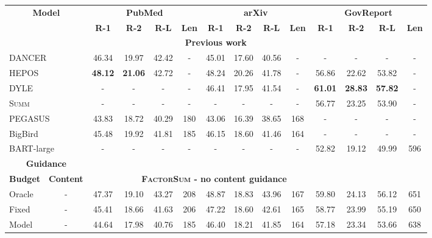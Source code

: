 \documentclass[11pt,table]{article}
\newcommand{\modelname}{FactorSum}
\begin{document}
\begin{table*}[h]
  \centering
  \setlength\tabcolsep{3.5pt}
  \begin{tabular}{lc|cccc|cccc|cccc}
    \toprule
    \multicolumn{2}{c|}{\multirow{2}{2.2cm}{\centering \textbf{Model}}} & \multicolumn{4}{c|}{\textbf{PubMed}} & \multicolumn{4}{c|}{\textbf{arXiv}} & \multicolumn{4}{c}{\textbf{GovReport}} \\
    \cmidrule(r){3-6} \cmidrule(r){7-10} \cmidrule(r){11-14} 
    &  & \textbf{R-1} & \textbf{R-2} & \textbf{R-L} & \textbf{Len} & \textbf{R-1} & \textbf{R-2} & \textbf{R-L} & \textbf{Len} & \textbf{R-1} & \textbf{R-2} & \textbf{R-L} & \textbf{Len} \\
    \toprule
    \multicolumn{14}{c}{\textbf{Previous work}} \\
    \midrule
    \multicolumn{2}{l|}{DANCER} & 46.34 & 19.97 & 42.42 & - & 45.01 & 17.60 & 40.56 & - & - & - & - & - \\
    \multicolumn{2}{l|}{HEPOS} & \textbf{48.12} & \textbf{21.06} & 42.72 & - & 48.24 & 20.26 & 41.78 & - & 56.86 & 22.62 & 53.82 & - \\
    \multicolumn{2}{l|}{DYLE} & - & - & - & - & 46.41 & 17.95 & 41.54 & - & \textbf{61.01} & \textbf{28.83} & \textbf{57.82} & - \\
    \multicolumn{2}{l|}{\textsc{Summ}} & - & - & - & - & - & - & - & - & 56.77 & 23.25 & 53.90 & - \\
    \multicolumn{2}{l|}{PEGASUS} & 43.83 & 18.72 & 40.29 & 180 & 43.06 & 16.39 & 38.65 & 168 & - & - & - & - \\
    \multicolumn{2}{l|}{BigBird} & 45.48 & 19.92 & 41.81 & 185 & 46.15 & 18.60 & 41.46 & 164 & - & - & - & - \\
    \multicolumn{2}{l|}{BART-large} & - & - & - & - & - & - & - & - & 52.82 & 19.12 & 49.99 & 596 \\
    \midrule
    \multicolumn{2}{c|}{\textbf{Guidance}} & \multicolumn{12}{c}{} \\
    \cmidrule(r){1-2}
    \textbf{Budget} & \textbf{Content} & \multicolumn{9}{c}{\textbf{\textsc{\modelname} - no content guidance}} \\
    \midrule
    Oracle & - & 47.37 & 19.10 & 43.27 & 208 & 48.87 & 18.83 & 43.96 & 167 & 59.80 & 24.13 & 56.12 & 651 \\
    Fixed & - & 45.41 & 18.66 & 41.63 & 206 & 47.22 & 18.60 & 42.61 & 165 & 58.77 & 23.99 & 55.19 & 650 \\
    Model & - & 44.64 & 17.98 & 40.76 & 185 & 46.40 & 18.21 & 41.85 & 164 & 57.18 & 23.34 & 53.66 & 638 \\

\end{tabular}
\end{table*}
\end{document}
